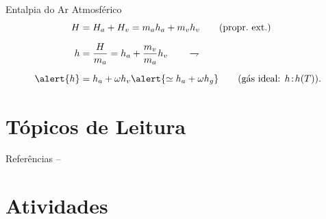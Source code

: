     \begin{frame}{Entalpia do Ar Atmosférico}\vspace*{-0em}
        \begin{align*}
            H &= H_a + H_v = m_ah_a + m_vh_v
            \qquad\mbox{(propr.~ext.)}
            \\[\medskipamount]
            h &= \frac{H}{m_a} = h_a + \frac{m_v}{m_a}h_v
            \qquad\rightharpoondown
            \\[\medskipamount]
            \alert{h} &
            = h_a + \omega h_v
            \alert{\simeq h_a + \omega h_g}
            \qquad\mbox{(gás ideal: $h\!:\!h(T)$)}.
        \end{align*}
    \end{frame}

\section{Tópicos de Leitura}

    \begin{frame}[allowframebreaks]{Referências -- }
        
        
    \end{frame}

\section{Atividades}

